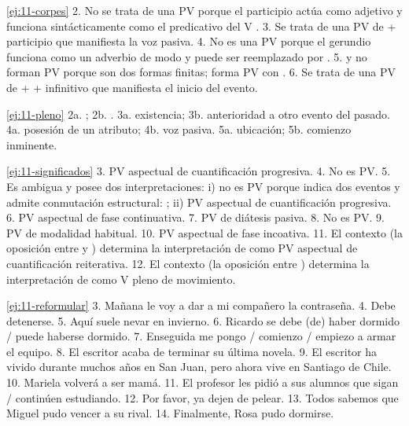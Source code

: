 \begin{solucion}{\ref{ej:11-corpes}}
2. No se trata de una PV porque el participio  actúa como
adjetivo y funciona sintácticamente como el predicativo del V . 3. Se
trata de una PV de  + participio que manifiesta la voz pasiva. 4. No
es una PV porque el gerundio funciona como un adverbio de modo y puede ser
reemplazado por . 5.  y  no forman PV
porque son dos formas finitas;  forma PV con . 6. Se
trata de una PV de  +  + infinitivo que manifiesta el
inicio del evento.
\end{solucion}

\begin{solucion}{\ref{ej:11-pleno}}
2a. ; 2b. . 3a. existencia; 3b.
anterioridad a otro evento del pasado. 4a. posesión de un atributo; 4b. voz
pasiva. 5a. ubicación; 5b. comienzo inminente.
\end{solucion}

\begin{solucion}{\ref{ej:11-significados}}
3. PV aspectual de cuantificación progresiva. 4. No es PV. 5. Es ambigua y posee
dos interpretaciones: i) no es PV porque indica dos eventos y admite conmutación
estructural: ; ii) PV aspectual de cuantificación progresiva. 6. PV aspectual de
fase continuativa. 7. PV de diátesis pasiva. 8. No es PV. 9. PV de modalidad
habitual. 10. PV aspectual de fase incoativa. 11. El contexto (la oposición entre
 y ) determina la interpretación de
 como PV aspectual de cuantificación reiterativa. 12. El contexto
(la oposición entre )
determina la interpretación de  como V pleno de movimiento.
\end{solucion}

\begin{solucion}{\ref{ej:11-reformular}}
3. Mañana le voy a dar a mi compañero la contraseña. 4. Debe detenerse. 5. Aquí
suele nevar en invierno. 6. Ricardo se debe (de) haber dormido / puede haberse
dormido. 7. Enseguida me pongo / comienzo / empiezo a armar el equipo. 8. El
escritor acaba de terminar su última novela. 9. El escritor ha vivido durante
muchos años en San Juan, pero ahora vive en Santiago de Chile. 10. Mariela
volverá a ser mamá. 11. El profesor les pidió a sus alumnos que sigan / continúen
estudiando. 12. Por favor, ya dejen de pelear. 13. Todos sabemos que Miguel pudo
vencer a su rival. 14. Finalmente, Rosa pudo dormirse.
\end{solucion}

